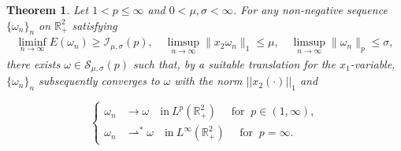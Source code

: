\documentclass[10pt,a4paper]{amsart}
\newtheorem{theorem}{Theorem}[section]
\theoremstyle{definition}
\theoremstyle{definition}
\numberwithin{equation}{section}
\newcommand{\0}{\emptyset}
\newcommand{\bbR}{\mathbb R}
\newcommand{\calI}{\mathcal I}
\newcommand{\calS}{\mathcal S}
\begin{document}
\setcounter{section}{5}
\setcounter{equation}{0}
\setcounter{theorem}{1}
			\begin{theorem}\label{thm_existence_new}
				Let $1<p\leq \infty$ and $0<\mu, \sigma <\infty$. For any non-negative sequence $\{\omega_n\}_{n}$ on $\bbR^{2}_{+}$  satisfying 
				\begin{equation}\label{eq_stab_energy}
					\begin{aligned}
						{\liminf_{n \to \infty} E(\omega_n) \ge \calI_{\mu, \sigma}(p), \quad
							\limsup_{n \to \infty}\|x_2 \omega_n\|_1} \le \mu, \quad
						\limsup_{n \to \infty} \|\omega_n\|_p \le \sigma, 
					\end{aligned}
				\end{equation}
				there exists $\omega \in \calS_{\mu, \sigma}(p)$ such that, by a suitable translation for the $x_1$-variable, $\{\omega_{n} \}_n$ subsequently converges to $\omega$ with the norm $||x_2 (\cdot)||_{1}$ and 
				
				\begin{equation}
					\left\{
					\begin{aligned}
						\omega_{n}&\to \omega\quad \textrm{in}\ L^{p}(\mathbb{R}^{2}_{+})\quad \textrm{ for }\ p \in (1, \infty),\\
						\omega_{n} &\rightharpoonup^* \omega \quad \textrm{in}\ L^{\infty}(\mathbb{R}^{2}_{+})\quad \textrm{ for }\ p=\infty.
					\end{aligned}
					\right.
				\end{equation}
			\end{theorem}
\end{document}
